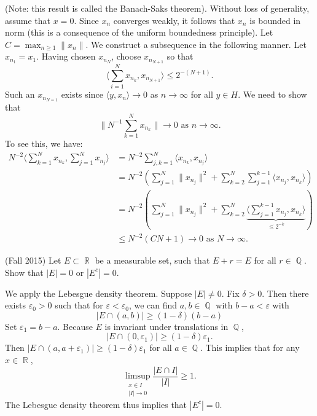 \documentclass[answers]{exam}
\DeclareMathOperator{\RR}{\mathbb{R}}
\DeclareMathOperator{\QQ}{\mathbb{Q}}
\begin{document}
\begin{questions}
\begin{solution}
  (Note: this result is called the Banach-Saks theorem). Without loss of generality, assume that $x=0$. Since $x_{n}$ converges weakly, it follows that $x_{n}$ is bounded in norm (this is a consequence of the uniform boundedness principle). Let $C = \max_{n\geq 1}\| x_{n} \|$. We construct a subsequence in the following manner. Let $x_{n_{1}}=x_{1}$. Having chosen $x_{n_{N}}$, choose $x_{n_{N+1}}$ so that
  \begin{equation*}
    \Big\langle \sum_{i=1}^{N}x_{n_{k}},x_{n_{N+1}}\Big\rangle \leq 2^{-(N+1)}.
  \end{equation*}
  Such an $x_{n_{N=1}}$ exists since $\langle y,x_{n}\rangle \to 0$ as $n\to \infty$ for all $y\in H$. We need to show that
  \begin{equation*}
    \| N^{-1}\sum_{k=1}^{N}x_{n_{k}} \|\to 0 \text{ as }n\to\infty.
  \end{equation*}
  To see this, we have:
  \begin{align*}
    N^{-2}\Big\langle \sum_{k=1}^{N}x_{n_{k}}, \sum_{j=1}^{N}x_{n_{j}} \Big\rangle
    &= N^{-2}\sum_{j,k=1}^{N}\Big\langle x_{n_{k}}, x_{n_{j}}\Big\rangle\\
    &= N^{-2}\left( \sum_{j=1}^{N} \| x_{n_{j}}\|^{2}+ \sum_{k=2}^{N}\sum_{j=1}^{k-1}\langle x_{n_{j}},x_{n_{k}}\rangle \right)\\
    &=N^{-2} \left(  \sum_{j=1}^{N} \| x_{n_{j}} \|^{2}+ \sum_{k=2}^{N}\underbrace{\Big\langle \sum_{j=1}^{k-1} x_{n_{j}},x_{n_{k}}\Big\rangle}_{\leq 2^{-k}} \right)\\
    &\leq N^{-2} \left( C N + 1  \right) \to 0 \text{ as } N\to\infty.
  \end{align*}
\end{solution}

  
  
\question (Fall 2015) Let $E \subset \RR$ be a measurable set, such that $E + r = E$ for all $r \in \QQ$. Show that $|E| = 0$ or $|E^c| = 0$.
\begin{solution}
    We apply the Lebesgue density theorem. Suppose $|E| \neq 0$. Fix $\delta > 0$. Then there exists $\varepsilon_0 > 0$ such that for $\varepsilon < \varepsilon_0$, we can find $a,b \in \QQ$ with $b - a < \varepsilon$ with
    \[ |E \cap (a,b)| \geq (1 - \delta) (b - a) \]
    Set $\varepsilon_1 = b - a$. Because $E$ is invariant under translations in $\QQ$,
    \[ |E \cap (0,\varepsilon_1)| \geq (1 - \delta) \varepsilon_1. \]
    Then $|E \cap (a,a + \varepsilon_1)| \geq (1 - \delta) \varepsilon_1$ for all $a \in \QQ$. This implies that for any $x \in \RR$,
    \[ \limsup_{\substack{x \in I\\|I| \to 0}} \frac{|E \cap I|}{|I|} \geq 1. \]
    The Lebesgue density theorem thus implies that $|E^c| = 0$.
\end{solution}


\end{questions}
\end{document}
